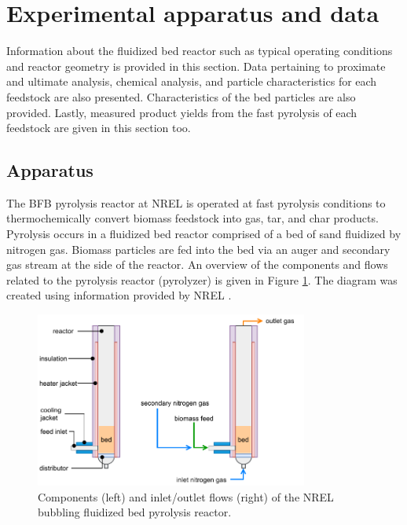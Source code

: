 
\section{Experimental apparatus and data}

Information about the fluidized bed reactor such as typical operating conditions and reactor geometry is provided in this section. Data pertaining to proximate and ultimate analysis, chemical analysis, and particle characteristics for each feedstock are also presented. Characteristics of the bed particles are also provided. Lastly, measured product yields from the fast pyrolysis of each feedstock are given in this section too.

\subsection{Apparatus}

The BFB pyrolysis reactor at NREL is operated at fast pyrolysis conditions to thermochemically convert biomass feedstock into gas, tar, and char products. Pyrolysis occurs in a fluidized bed reactor comprised of a bed of sand fluidized by nitrogen gas. Biomass particles are fed into the bed via an auger and secondary gas stream at the side of the reactor. An overview of the components and flows related to the pyrolysis reactor (pyrolyzer) is given in Figure \ref{fig:pyrolyzer1}. The diagram was created using information provided by NREL \cite{French-2019}.

\begin{figure}[H]
    \centering
    \includegraphics[width=0.8\textwidth]{figures/pyrolyzer1.pdf}
    \caption{Components (left) and inlet/outlet flows (right) of the NREL bubbling fluidized bed pyrolysis reactor.}
    \label{fig:pyrolyzer1}
\end{figure}

